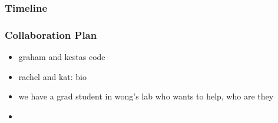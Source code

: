 \documentclass[11pt]{article}
\begin{document}
		\subsubsection{Timeline}

		\subsubsection{Collaboration Plan}
		\begin{itemize}
			\item graham and kestas code
			\item rachel and kat: bio
			\item we have a grad student in wong's lab who wants to help, who are they 
			\item 
		\end{itemize}
\printbibliography[heading=bibintoc]{}
\newpage


% 
% 
\end{document}
